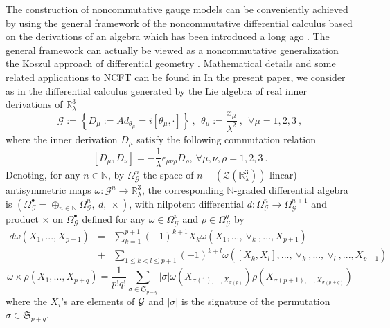\documentclass[10pt]{book}
\theoremstyle{break}
\begin{document}
The construction of noncommutative gauge models can be conveniently achieved by using the general framework of the noncommutative differential calculus based on the derivations of an algebra which has been introduced a long ago %
. The general framework can actually be viewed as a noncommutative generalization the Koszul approach of differential geometry %
. Mathematical details and some related applications to NCFT can be found in %
In the present paper, we consider as in %
the differential calculus generated by the Lie algebra of real inner derivations of $\mathbb{R}^3_\lambda$%
%
\begin{equation*}
\mathcal{G} := \left\{D_\mu:= Ad_{\theta_\mu}= i \left[\theta_\mu, \cdot\right]\right\} \ ,  \ \ \theta_\mu := \frac{x_\mu}{\lambda^2} \ , \ \ \forall \mu = 1,2,3 \ , %
\end{equation*}
%
where the inner derivation $D_\mu$ satisfy the following commutation relation%
%
\begin{equation*}
\left[D_\mu,D_\nu\right] = -\frac{1}{\lambda} \epsilon_{\mu\nu\rho} D_\rho,\ \forall \mu,\nu,\rho = 1,2,3 \ . %
\end{equation*}
%
Denoting, for any $n\in\mathbb{N}$, by $\Omega^n_\mathcal{G}$ the space of $n-(\mathcal{Z}(\mathbb{R}^3_\lambda))$-linear) antisymmetric maps $\omega:\mathcal{G}^n\to\mathbb{R}^3_\lambda$, the corresponding $\mathbb{N}$-graded differential algebra is $(\Omega_\mathcal{G}^\bullet = \oplus_{n\in\mathbb{N}} \Omega^n_\mathcal{G},\ d,\ \times)$, with nilpotent differential $d:\Omega^n_\mathcal{G}\to\Omega^{n+1}_\mathcal{G}$ and product $\times$ on $\Omega_\mathcal{G}^\bullet$ defined for any $\omega\in\Omega^p_\mathcal{G}$ and $\rho\in\Omega^q_\mathcal{G}$ by
\begin{eqnarray*}
d\omega(X_1,...,X_{p+1})&=&\sum_{k=1}^{p+1}(-1)^{k+1}X_k\omega(X_1,...,\vee_k,...,X_{p+1})\nonumber\\
&+&\sum_{1\le k<l\le p+1}(-1)^{k+l}\omega([X_k,X_l],...,\vee_k,...,\vee_l,...,X_{p+1})%
\end{eqnarray*}
%
\begin{equation*}
\omega\times\rho(X_1,...,X_{p+q})=\frac{1}{p!q!}\sum_{\sigma\in\mathfrak{S}_{p+q}}\vert\sigma\vert\omega(X_{\sigma(1),...,X_{\sigma(p)}})
\rho(X_{\sigma(p+1),...,X_{\sigma(p+q)}})%
\end{equation*}
%
where the $X_i$'s are elements of ${\cal{G}}$ and $\vert\sigma\vert$ is the signature of the permutation $\sigma\in\mathfrak{S}_{p+q}$.\par 
\end{document}

